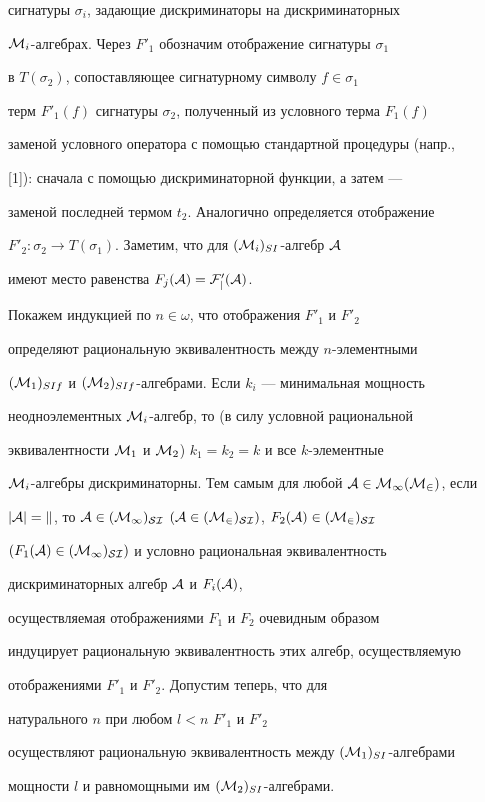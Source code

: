 \begin{pf}
сигнатуры $\sigma_i$, задающие дискриминаторы на дискриминаторных


${\cal M}_i$-алгебрах. Через $F'_1$ обозначим отображение сигнатуры $\sigma_1$


в $T(\sigma_2)$, сопоставляющее сигнатурному символу $f\in\sigma_1$


терм $F'_1(f)$ сигнатуры $\sigma_2$, полученный из условного терма $F_1(f)$


заменой условного оператора с помощью стандартной процедуры (напр.,


[1]): сначала с помощью дискриминаторной функции, а затем ---


заменой последней термом $t_2$. Аналогично определяется отображение


$F'_2:\sigma_2\to T(\sigma_1)$. Заметим, что для $({\cal M}_i)_{SI}$-алгебр $\cal A$


имеют место равенства $F_j(\cal A)=F'_j(\cal A)$.





Покажем индукцией по $n\in\omega$, что отображения $F'_1$ и $F'_2$


определяют рациональную эквивалентность между $n$-элементными


$({\cal M}_1)_{SIf}$ и $({\cal M}_2)_{SIf}$-алгебрами. Если $k_i$ --- минимальная мощность


неодноэлементных ${\cal M}_i$-алгебр, то (в силу условной рациональной


эквивалентности ${\cal M}_1$ и ${\cal M}_2$) $k_1=k_2=k$ и все $k$-элементные


${\cal M}_i$-алгебры дискриминаторны. Тем самым для любой $\cal A\in{\cal M}_1({\cal M}_2)$, если


$|\cal A|=k$, то $\cal A\in({\cal M}_1)_{SI}$ $(\cal A\in({\cal M}_2)_{SI})$, $F_2(\cal A)\in({\cal M}_2)_{SI}$


$(F_1(\cal A)\in({\cal M}_1)_{SI})$ и условно рациональная эквивалентность


дискриминаторных алгебр $\cal A$ и $F_i(\cal A)$,


осуществляемая отображениями $F_1$ и $F_2$ очевидным образом


индуцирует рациональную эквивалентность этих алгебр, осуществляемую


отображениями $F'_1$ и $F'_2$. Допустим теперь, что для


натурального $n$ при любом $l<n$\; $F'_1$ и $F'_2$


осуществляют рациональную эквивалентность между $({\cal M}_1)_{SI}$-алгебрами


мощности $l$ и равномощными им $({\cal M}_2)_{SI}$-алгебрами.



\end{pf}
